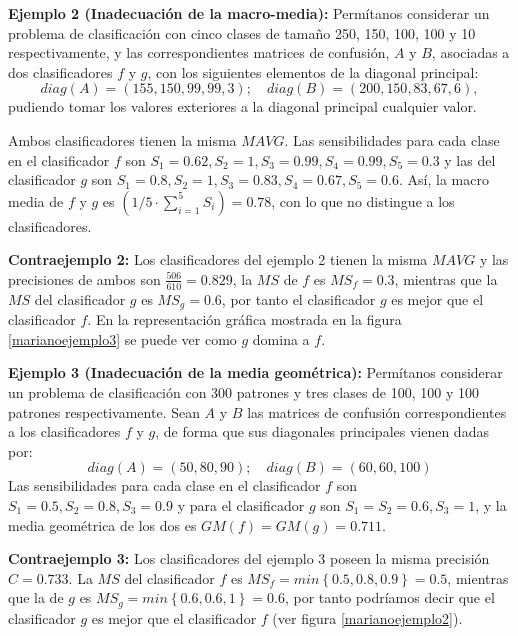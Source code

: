 \textbf{Ejemplo 2 (Inadecuación de la macro-media):} Permítanos considerar un problema de
clasificación con cinco clases de tamaño 250, 150, 100, 100 y 10 respectivamente, y las
correspondientes matrices de confusión, $A$ y $B$,  asociadas a dos clasificadores $f$ y
$g$, con los siguientes elementos de la diagonal principal:
\begin{displaymath}
diag(A)=\left( 155,150,99,99,3\right); \quad
diag(B)=\left( 200,150,83,67,6\right),
\end{displaymath}
pudiendo tomar los valores exteriores a la diagonal principal cualquier valor.

Ambos clasificadores tienen la misma $MAVG$. Las sensibilidades para cada clase en el
clasificador $f$ son $\displaystyle S_{1}=0.62, S_{2}=1, S_{3}=0.99, S_{4}=0.99,
S_{5}=0.3$ y las del clasificador $g$ son $\displaystyle S_{1}=0.8, S_{2}=1, S_{3}=0.83,
S_{4}=0.67, S_{5}=0.6$. Así, la macro media de $f$ y $g$ es $\displaystyle \left( 1/5
\cdot \sum_{i=1}^5 S_{i}\right) =0.78$, con lo que no distingue a los clasificadores.

\textbf{Contraejemplo 2:} Los clasificadores del ejemplo 2 tienen la misma $MAVG$
y las precisiones de ambos son $\displaystyle \frac{506}{610}=0.829$, la $MS$ de
$f$ es $MS_{f}=0.3$, mientras que la $MS$ del clasificador $g$ es $\displaystyle
MS_{g}=0.6$, por tanto el clasificador $g$ es mejor que el clasificador $f$. En la
representación gráfica mostrada en la figura \ref{marianoejemplo3} se puede ver como $g$
domina a $f$.

\textbf{Ejemplo 3 (Inadecuación de la media geométrica):} Permítanos considerar un
problema de clasificación con 300 patrones y tres clases de 100, 100 y 100 patrones
respectivamente. Sean $A$ y $B$ las matrices de confusión correspondientes a los
clasificadores $f$ y $g$, de forma que sus diagonales principales vienen dadas por:
\begin{displaymath}
diag(A)= (50,80,90); \quad diag(B)= (60,60,100)
\end{displaymath}
Las sensibilidades para cada clase en el clasificador $f$ son $S_{1}=0.5, S_{2}=0.8,
S_{3}=0.9$ y para el clasificador $g$ son $S_{1}=S_{2}=0.6, S_{3}=1$, y la media
geométrica de los dos es $GM(f)=GM(g)=0.711$.

\textbf{Contraejemplo 3:} Los clasificadores del ejemplo 3 poseen la misma precisión
$C=0.733$. La $MS$ del clasificador $f$ es $MS_{f}=min\left\lbrace
0.5,0.8,0.9\right\rbrace = 0.5$, mientras que la de $g$ es $MS_{g}=min\left\lbrace
0.6,0.6,1\right\rbrace = 0.6$, por tanto podríamos decir que el clasificador $g$ es mejor
que el clasificador $f$ (ver figura \ref{marianoejemplo2}).


